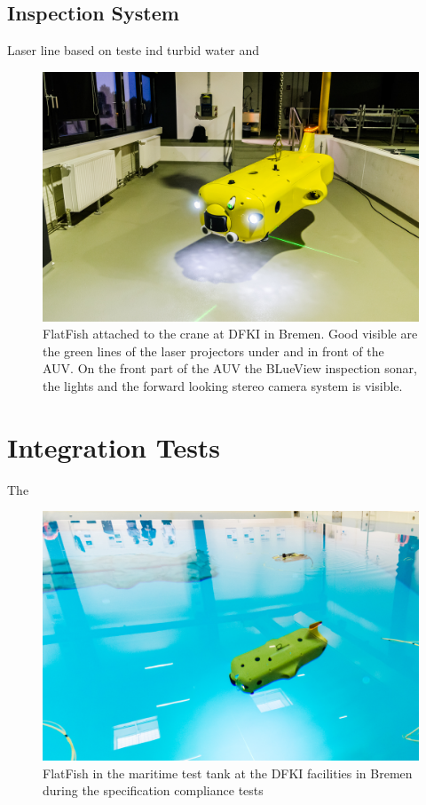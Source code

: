 \documentclass[conference]{IEEEtran}
\begin{document}
\subsection{Inspection System}

Laser line based on \cite{duda2013} teste ind turbid water \cite{albiez2015} and \cite{mcleod2013}

\begin{figure}[!t]
	\centering
	\includegraphics[width=0.9\columnwidth]{FlatFish-3.jpg}
	\caption{FlatFish attached to the crane at DFKI in Bremen. Good visible are the green lines of the laser projectors under and in front of the AUV. On the front part of the AUV the BLueView inspection sonar, the lights and the forward looking stereo camera system is visible.}
	\label{fig:flatfishlaser}
\end{figure}


\section{Integration Tests}

The 
\begin{figure}[!t]
	\centering
	\includegraphics[width=0.9\columnwidth]{FlatFish-2.jpg}
	\caption{FlatFish in the maritime test tank at the DFKI facilities in Bremen during the specification compliance tests}
	\label{fig:flatfish2}
\end{figure}
\end{document}
